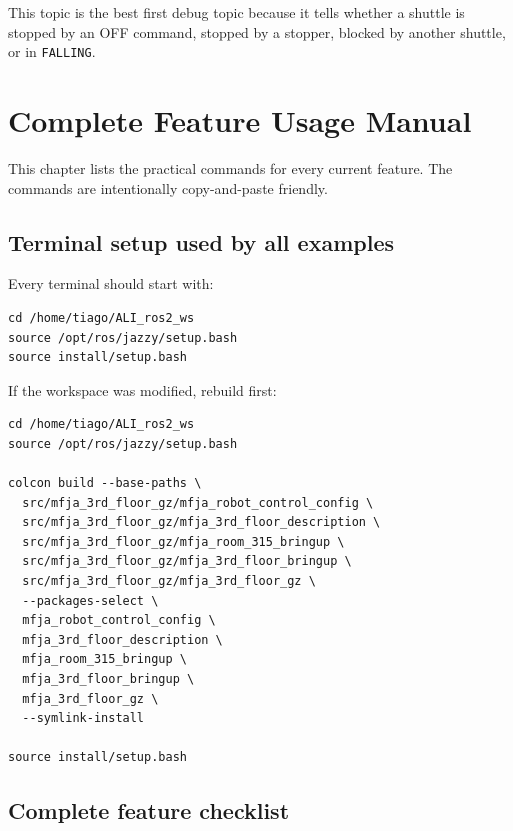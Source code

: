 \documentclass[12pt,a4paper]{report}
\newcommand{\codenext}[1]{\par\Needspace{#1\baselineskip}}
\begin{document}
\codenext{28}


This topic is the best first debug topic because it tells whether a shuttle is
stopped by an OFF command, stopped by a stopper, blocked by another shuttle, or
in \texttt{FALLING}.

\chapter{Complete Feature Usage Manual}

This chapter lists the practical commands for every current feature. The
commands are intentionally copy-and-paste friendly.

\section{Terminal setup used by all examples}

Every terminal should start with:

\begin{lstlisting}[style=terminalcode]
cd /home/tiago/ALI_ros2_ws
source /opt/ros/jazzy/setup.bash
source install/setup.bash
\end{lstlisting}

If the workspace was modified, rebuild first:

\begin{lstlisting}[style=terminalcode]
cd /home/tiago/ALI_ros2_ws
source /opt/ros/jazzy/setup.bash

colcon build --base-paths \
  src/mfja_3rd_floor_gz/mfja_robot_control_config \
  src/mfja_3rd_floor_gz/mfja_3rd_floor_description \
  src/mfja_3rd_floor_gz/mfja_room_315_bringup \
  src/mfja_3rd_floor_gz/mfja_3rd_floor_bringup \
  src/mfja_3rd_floor_gz/mfja_3rd_floor_gz \
  --packages-select \
  mfja_robot_control_config \
  mfja_3rd_floor_description \
  mfja_room_315_bringup \
  mfja_3rd_floor_bringup \
  mfja_3rd_floor_gz \
  --symlink-install

source install/setup.bash
\end{lstlisting}

\section{Complete feature checklist}
\end{document}
